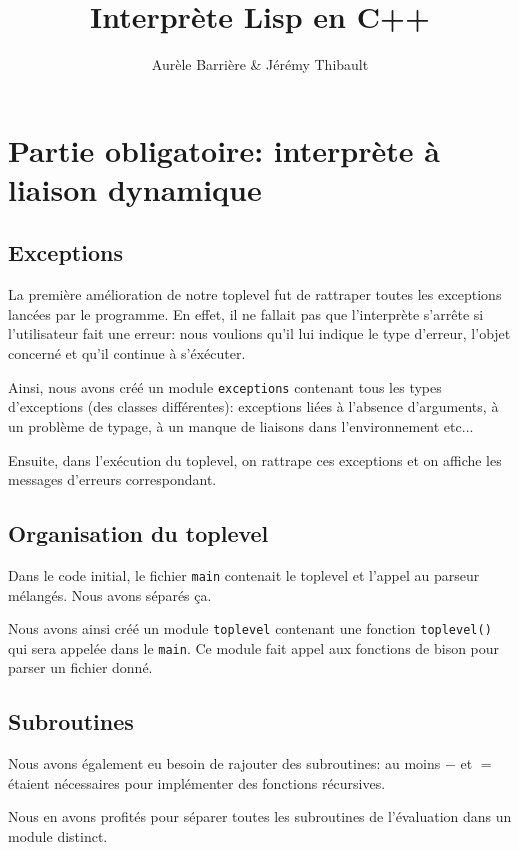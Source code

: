 \documentclass[12pt]{article}
\title{Interprète Lisp en C++}
\author{Aurèle Barrière \& Jérémy Thibault}
\def\code #1{\lstinline{#1}}
\begin{document}
\maketitle
\tableofcontents
\newpage

\section{Partie obligatoire: interprète à liaison dynamique}

\subsection{Exceptions}
La première amélioration de notre toplevel fut de rattraper toutes les exceptions lancées par le programme. En effet, il ne fallait pas que l'interprète s'arrête si l'utilisateur fait une erreur: nous voulions qu'il lui indique le type d'erreur, l'objet concerné et qu'il continue à s'éxécuter.

Ainsi, nous avons créé un module \code{exceptions} contenant tous les types d'exceptions (des classes différentes): exceptions liées à l'absence d'arguments, à un problème de typage, à un manque de liaisons dans l'environnement etc...

Ensuite, dans l'exécution du toplevel, on rattrape ces exceptions et on affiche les messages d'erreurs correspondant.

\subsection{Organisation du toplevel}

Dans le code initial, le fichier \code{main} contenait le toplevel et l'appel au parseur mélangés. Nous avons séparés ça.

Nous avons ainsi créé un module \code{toplevel} contenant une fonction \code{toplevel()} qui sera appelée dans le \code{main}. Ce module fait appel aux fonctions de bison pour parser un fichier donné.

\subsection{Subroutines}

Nous avons également eu besoin de rajouter des subroutines: au moins $-$ et $=$ étaient nécessaires pour implémenter des fonctions récursives.

Nous en avons profités pour séparer toutes les subroutines de l'évaluation dans un module distinct.
\end{document}
